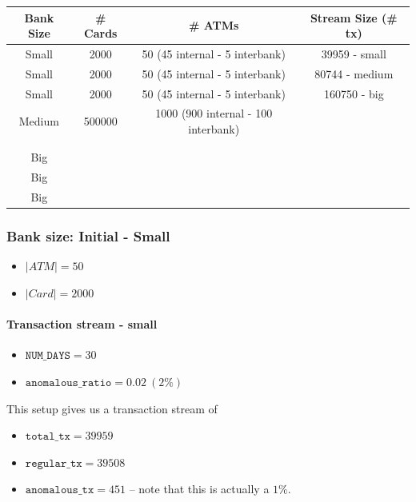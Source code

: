 \documentclass[12pt,a4paper]{article}
\begin{document}
\begin{table}[H]
\centering
\begin{tabular}{|c|c|c|c|}
\hline
Bank Size & \# Cards & \# ATMs & Stream Size (\# tx) \\ \hline
Small     & 2000     & 50 (45 internal - 5 interbank)     & 39959 - small       \\ \hline
Small     & 2000     & 50 (45 internal - 5 interbank)      & 80744 - medium      \\ \hline
Small     & 2000     & 50 (45 internal - 5 interbank)     & 160750 - big        \\ \hline
Medium    & 500000   & 1000 (900 internal - 100 interbank)   &                     \\ \hline
          &          &         &                     \\ \hline
          &          &         &                     \\ \hline
Big       &          &         &                     \\ \hline
Big       &          &         &                     \\ \hline
Big       &          &         &                     \\ \hline
\end{tabular}
\end{table}

\subsubsection{Bank size: Initial - Small}

\begin{itemize}
  \item $|ATM| = 50$
  \item $|Card| = 2000$
\end{itemize}

\paragraph{Transaction stream - small\\}

\begin{itemize}
  \item $\texttt{NUM\_DAYS} = 30$
  \item $\texttt{anomalous\_ratio} = 0.02\ (2\%)$ 
\end{itemize}

This setup gives us a transaction stream of 
\begin{itemize}
  \item $\texttt{total\_tx} = 39959$
  \item $\texttt{regular\_tx} = 39508$
  \item $\texttt{anomalous\_tx} = 451$ -- note that this is actually a $1\%$.
\end{itemize}
\end{document}
